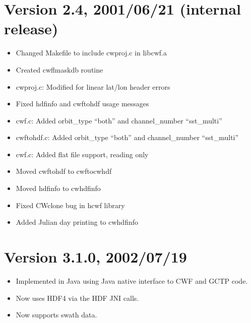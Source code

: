 

\section*{Version 2.4, 2001/06/21 (internal release)}

\begin{itemize}

  \item Changed Makefile to include cwproj.c in libcwf.a

  \item Created cwflmaskdb routine

  \item cwproj.c: Modified for linear lat/lon header errors

  \item Fixed hdfinfo and cwftohdf usage messages

  \item cwf.c: Added orbit\_type ``both'' and channel\_number
  ``sst\_multi''

  \item cwftohdf.c: Added orbit\_type ``both'' and channel\_number
  ``sst\_multi''

  \item cwf.c: Added flat file support, reading only

  \item Moved cwftohdf to cwftocwhdf

  \item Moved hdfinfo to cwhdfinfo

  \item Fixed CWclone bug in hcwf library

  \item Added Julian day printing to cwhdfinfo

\end{itemize}




\section*{Version 3.1.0, 2002/07/19}

\begin{itemize}

  \item Implemented in Java using Java native interface to CWF and
  GCTP code.

  \item Now uses HDF4 via the HDF JNI calls.

  \item Now supports swath data.

\end{itemize}


